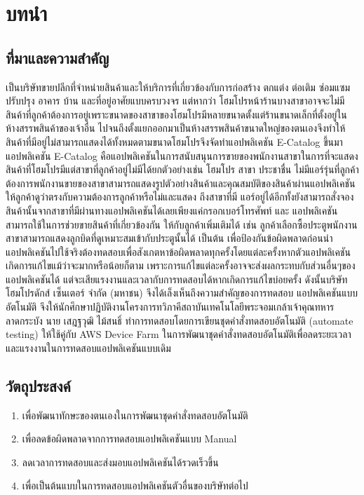 \chapter{บทนำ}
\thispagestyle{empty}
\label{chapter:introduction}

\section{ที่มาและความสำคัญ}
    {\Company} เป็นบริษัทขายปลีกที่จำหน่ายสินค้าและให้บริการที่เกี่ยวข้องกับการก่อสร้าง ตกแต่ง ต่อเติม ซ่อมแซม ปรับปรุง อาคาร บ้าน และที่อยู่อาศัยแบบครบวงจร
    แต่หากว่า โฮมโปรหน้าร้านบางสาขาอาจจะไม่มีสินค้าที่ลูกค้าต้องการอยู่เพราะขนาดของสาขาของโฮมโปรมีหลายขนาดตั้งแต่ร้านขนาดเล็กที่ตั้งอยู่ในห้างสรรพสินค้าของเจ้าอื่น
    ไปจนถึงตั้งแยกออกมาเป็นห้างสรรพสินค้าขนาดใหญ่ของตนเองจึงทำให้สินค้าที่มีอยู่ไม่สามารถแสดงได้ทั้งหมดตามขนาดโฮมโปรจึงจัดทำแอปพลิเคชัน E-Catalog ขึ้นมา
    แอปพลิเคชัน E-Catalog คือแอปพลิเคชันในการสนับสนุนการขายของพนักงานสาขาในการที่จะแสดงสินค้าที่โฮมโปรมีแต่สาขาที่ลูกค้าอยู่ไม่มีได้ยกตัวอย่างเช่น โฮมโปร
    สาขา ประชาชื่น ไม่มีแอร์รุ่นที่ลูกค้าต้องการพนักงานขายของสาขาสามารถแสดงรูปตัวอย่างสินค้าและคุณสมบัติของสินค้าผ่านแอปพลิเคชันให้ลูกค้าดูว่าตรงกับความต้องการลูกค้าหรือไม่และแสดง
    ถึงสาขาที่มี แอร์อยู่ได้อีกทั้งยังสามารถสั่งจองสินค้านั้นจากสาขาที่มีผ่านทางแอปพลิเคชันได้เลยเพียงแค่กรอกเบอร์โทรศัพท์ และ แอปพลิเคชันสามารถใช้ในการช่วยขายสินค้าที่เกี่ยวข้องกัน
    ให้กับลูกค้าเพิ่มเติมได้ เช่น ลูกค้าเลือกซื้อประตูพนักงานสาขาสามารถแสดงลูกบิดที่ดูเหมาะสมเข้ากับประตูนั้นได้ เป็นต้น
    เพื่อป้องกันข้อผิดพลาดก่อนนำแอปพลิเคชันไปใช้จริงต้องทดสอบเพื่อสังเกตหาข้อผิดพลาดทุกครั้งโดยแต่ละครั้งหากตัวแอปพลิเคชันเกิดการแก้ไขแม้ว่าจะมากหรือน้อยก็ตาม
    เพราะการแก้ไขแต่ละครั้งอาจจะส่งผลกระทบกับส่วนอื่นๆของแอปพลิเคชันได้ แต่จะเสียแรงงานและเวลากับการทดสอบได้หากเกิดการแก้ไขบ่อยครั้ง
    ดังนั้นบริษัท โฮมโปรดักส์ เซ็นเตอร์ จํากัด (มหาชน) จึงได้เล็งเห็นถึงความสําคัญของการทดสอบ
    แอปพลิเคชันแบบอัตโนมัติ จึงให้นักศึกษาปฏิบัติงานโครงการทวิภาคีสถาบันเทคโนโลยีพระจอมเกล้าเจ้าคุณทหารลาดกระบัง นาย เสฎฐวุฒิ ไม้สนธิ์ ทำการทดสอบโดยการเขียนชุดคำสั่งทดสอบอัตโนมัติ (automate testing) ให้ใช้คู่กับ AWS Device Farm
    ในการพัฒนาชุดคำสั่งทดสอบอัตโนมัติเพื่อลดระยะเวลาและแรงงานในการทดสอบแอปพลิเคชันแบบเดิม

\section{วัตถุประสงค์}
    \begin{enumerate}
        \item เพื่อพัฒนาทักษะของตนเองในการพัฒนาชุดคำสั่งทดสอบอัตโนมัติ
        \item เพื่อลดข้อผิดพลาดจากการทดสอบแอปพลิเคชันแบบ Manual
        \item ลดเวลาการทดสอบและส่งมอบแอปพลิเคชันได้รวดเร็วขึ้น
        \item เพื่อเป็นต้นแบบในการทดสอบแอปพลิเคชันตัวอื่นของบริษัทต่อไป
    \end{enumerate}

